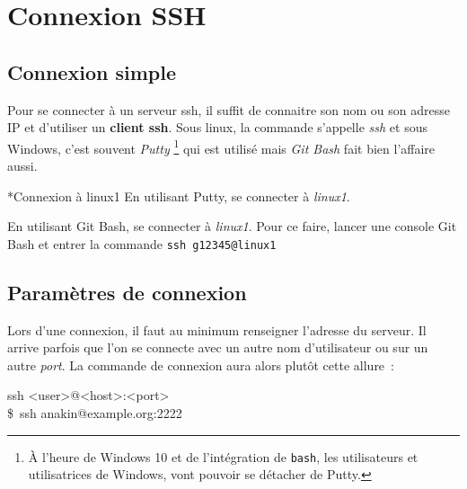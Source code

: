 \documentclass[a4paper,11pt]{article}
\begin{document}
\section{Connexion SSH}
\label{connexion-ssh}

\secttoc 

\subsection{Connexion simple}

Pour se connecter à un serveur ssh, il suffit de connaitre son nom ou son
adresse IP et d'utiliser un \textbf{client ssh}. Sous linux, la commande s'appelle \textit{ssh} et sous Windows, c'est souvent \textit{Putty}
\footnote{À l'heure de Windows 10 et de l'intégration de \texttt{bash}, les
utilisateurs et utilisatrices de Windows, vont pouvoir se détacher de Putty.}
qui est utilisé mais \textit{Git Bash} fait bien l'affaire aussi. 

\begin{Exercice}*{Connexion à linux1}
	En utilisant Putty, se connecter à \textit{linux1}. 

	En utilisant Git Bash, se connecter à \textit{linux1}. Pour ce faire, lancer
	une console Git Bash et entrer la commande \texttt{ssh g12345@linux1}

\end{Exercice}



\subsection{Paramètres de connexion}

Lors d'une connexion, il faut au minimum renseigner l'adresse du serveur. Il
arrive parfois que l'on se connecte avec un autre nom d'utilisateur ou sur un
autre \textit{port}. La commande de connexion aura alors plutôt cette allure~:

\begin{term}
	ssh <user>@<host>:<port> \\
	\$\, ssh anakin@example.org:2222
\end{term}
\end{document}

